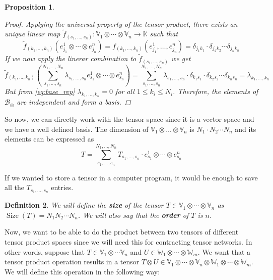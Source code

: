 \documentclass[11pt,a4paper,openright,oneside]{book}
\numberwithin{equation}{section}
\newtheorem{defn0}{Definition}[chapter]
\newtheorem{prop0}[defn0]{Proposition}
\newenvironment{definition}{ \begin{defn0}}{\end{defn0}}
\newenvironment{proposition}{\bigskip \begin{prop0}}{\end{prop0}}
\DeclareMathOperator{\size}{Size}
\begin{document}
\begin{proposition}
\begin{proof}
Applying the universal property of the tensor product, there exists an unique linear map $\tilde f_{(s_1, \dots, s_n)} : \mathbb{V}_1 \otimes \cdots \otimes \mathbb{V}_n \rightarrow \mathbb{K}$
such that
$$\tilde f_{(k_1, \dots, k_n)}(e_{j_1}^1 \otimes \cdots \otimes e_{j_n}^n) = f_{(k_1, \dots, k_n)}(e_{j_1}^1, \dots, e_{j_n}^n) = \delta_{j_1 k_1} \cdot \delta_{j_2 k_2} \cdots \delta_{j_n k_n}$$
If we now apply the linerar combination to $\tilde f_{(s_1, \dots, s_n)}$ we get
$$\tilde f_{(k_1, \dots, k_n)} \left( 
\sum_{s_1, \dots, s_n}^{N_1, \dots, N_n} \lambda_{s_1, \dots, s_n} e_{s_1}^1 \otimes \cdots \otimes e_{s_n}^n 
\right) =  \sum_{s_1, \dots, s_n}^{N_1, \dots, N_n} \lambda_{s_1, \dots, s_n} \cdot \delta_{k_1 s_1} \cdot \delta_{k_2 s_2} \cdots \delta_{k_n s_n} = \lambda_{k_1, \dots, k_n}$$
But from \eqref{eq:base_rep} $\lambda_{k_1, \dots, k_n} = 0$ for all
$1 \leqslant k_i \leqslant N_i$. Therefore, the elements of $\mathcal{B}_\otimes$ are independent and form a basis.
\end{proof}
\end{proposition}


So now, we can directly work with the tensor space since it is a vector space
and we have a well defined basis. The dimension
    of ${\mathbb{V}_1 \otimes \dots \otimes \mathbb{V}_n}$ is ${N_1 \cdot N_2 \cdots N_n}$ and its elements can be expressed as
    \begin{equation} \label{eq:base-representation}
T = \sum_{s_1, \dots, s_n}^{N_1, \dots, N_n} T_{s_1, \dots, s_n} \cdot  e_{s_1}^1 \otimes \cdots \otimes e_{s_n}^n
\end{equation}

If we wanted to store a tensor in a computer program, it would be enough to save all the $T_{s_1, \dots, s_n}$ entries.

\begin{definition}
We will define the \textbf{size} of the tensor $T \in \mathbb{V}_1 \otimes \cdots \otimes \mathbb{V}_n$ as $\size(T) = N_1 N_2 \cdots N_n$. We will 
also say that the \textbf{order} of $T$ is $n$.
\end{definition}

Now, we want to be able to do the product between two tensors of different tensor product spaces since we will need this for contracting
tensor networks. In other words, suppose that
$T \in \mathbb{V}_1 \otimes \cdots \mathbb{V}_n$ and $U \in \mathbb{W}_1 \otimes \cdots \otimes \mathbb{W}_m$. We want 
that a tensor product
operation results in a tensor $T \otimes U \in \mathbb{V}_1 \otimes \cdots \otimes \mathbb{V}_n \otimes \mathbb{W}_1 \otimes \cdots \otimes \mathbb{W}_m$.
We will define this operation in the following way:
\end{document}
